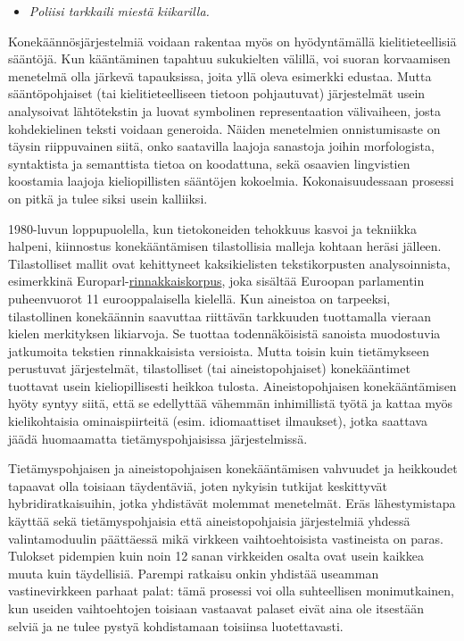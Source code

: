 \documentclass[]{../../metanetpaper}
\begin{document}
\begin{multicols}{2}
\begin{itemize}
\item[] \textit{Poliisi tarkkaili miestä kiikarilla.}
\end{itemize}

Konekäännösjärjestelmiä voidaan rakentaa myös on hyödyntämällä
kielitieteellisiä sääntöjä. Kun kääntäminen tapahtuu sukukielten
välillä, voi suoran korvaamisen menetelmä olla järkevä tapauksissa,
joita yllä oleva esimerkki edustaa. Mutta sääntöpohjaiset (tai
kielitieteelliseen tietoon pohjautuvat) järjestelmät usein analysoivat
lähtötekstin ja luovat symbolinen representaation välivaiheen, josta
kohdekielinen teksti voidaan generoida. Näiden menetelmien
onnistumisaste on täysin riippuvainen siitä, onko saatavilla laajoja
sanastoja joihin morfologista, syntaktista ja semanttista tietoa on
koodattuna, sekä osaavien lingvistien koostamia laajoja
kieliopillisten sääntöjen kokoelmia. Kokonaisuudessaan prosessi on
pitkä ja tulee siksi usein kalliiksi.

1980-luvun loppupuolella, kun tietokoneiden tehokkuus kasvoi ja
tekniikka halpeni, kiinnostus konekääntämisen tilastollisia malleja
kohtaan heräsi jälleen. Tilastolliset mallit ovat kehittyneet
kaksikielisten tekstikorpusten analysoinnista, esimerkkinä
Europarl-\underline{rinnakkaiskorpus}, joka sisältää Euroopan parlamentin
puheenvuorot 11 eurooppalaisella kielellä. Kun aineistoa on tarpeeksi,
tilastollinen konekäännin saavuttaa riittävän tarkkuuden tuottamalla
vieraan kielen merkityksen likiarvoja. Se tuottaa todennäköisistä
sanoista muodostuvia jatkumoita tekstien rinnakkaisista
versioista. Mutta toisin kuin tietämykseen perustuvat järjestelmät,
tilastolliset (tai aineistopohjaiset) konekääntimet tuottavat usein
kieliopillisesti heikkoa tulosta.  Aineistopohjaisen konekääntämisen
hyöty syntyy siitä, että se edellyttää vähemmän inhimillistä työtä ja
kattaa myös kielikohtaisia ominaispiirteitä (esim. idiomaattiset
ilmaukset), jotka saattava jäädä huomaamatta tietämyspohjaisissa
järjestelmissä.


Tietämyspohjaisen ja aineistopohjaisen konekääntämisen vahvuudet ja
heikkoudet tapaavat olla toisiaan täydentäviä, joten nykyisin tutkijat
keskittyvät hybridiratkaisuihin, jotka yhdistävät molemmat
menetelmät. Eräs lähestymistapa käyttää sekä tietämyspohjaisia että
aineistopohjaisia järjestelmiä yhdessä valintamoduulin päättäessä mikä
virkkeen vaihtoehtoisista vastineista on paras.  Tulokset pidempien
kuin noin 12 sanan virkkeiden osalta ovat usein kaikkea muuta kuin
täydellisiä. Parempi ratkaisu onkin yhdistää useamman vastinevirkkeen
parhaat palat: tämä prosessi voi olla suhteellisen monimutkainen, kun
useiden vaihtoehtojen toisiaan vastaavat palaset eivät aina ole
itsestään selviä ja ne tulee pystyä kohdistamaan toisiinsa
luotettavasti.


\end{multicols}
\end{document}
